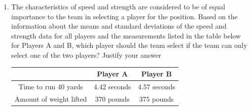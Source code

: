 \documentclass[a4paper, 12pt,twoside]{book}
\begin{document}
{\begin{minipage}{\textwidth}
\begin{enumerate}[label = (\alph* )]
   \item The characteristics of speed and strength are considered to be of equal importance to the team in selecting a player for the position. Based on the information about the means and standard deviations of the speed and strength data for all players and the measurements listed in the table below for Players A and B, which player should the team select if the team can only select one of the two players? Justify your answer
          \begin{center}
             \begin{tabular}{|c|c|c|}
             \hline
             &Player A & Player B\\
             \hline
             Time to run 40 yards & $4.42$ seconds & $4.57$ seconds\\
             \hline
             Amount of weight lifted & $370$ pounds& $375$ pounds\\
             \hline
             \end{tabular}
          \end{center}
   \end{enumerate}
\end{minipage}
}
\newpage
\end{document}
